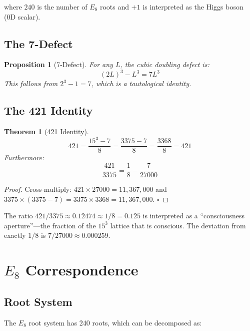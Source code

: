 \documentclass[11pt]{article}
\newtheorem{theorem}{Theorem}
\newtheorem{proposition}{Proposition}
\begin{document}
where $240$ is the number of $E_8$ roots and $+1$ is interpreted as the Higgs boson (0D scalar).

\subsection{The 7-Defect}

\begin{proposition}[7-Defect]
For any $L$, the cubic doubling defect is:
\begin{equation}
(2L)^3 - L^3 = 7L^3
\end{equation}
This follows from $2^3 - 1 = 7$, which is a tautological identity.
\end{proposition}

\subsection{The 421 Identity}

\begin{theorem}[421 Identity]
\begin{equation}
421 = \frac{15^3 - 7}{8} = \frac{3375 - 7}{8} = \frac{3368}{8} = 421
\end{equation}
Furthermore:
\begin{equation}
\frac{421}{3375} = \frac{1}{8} - \frac{7}{27000}
\end{equation}
\end{theorem}

\begin{proof}
Cross-multiply: $421 \times 27000 = 11{,}367{,}000$ and $3375 \times (3375 - 7) = 3375 \times 3368 = 11{,}367{,}000$. $\square$
\end{proof}

The ratio $421/3375 \approx 0.12474 \approx 1/8 = 0.125$ is interpreted as a ``consciousness aperture''---the fraction of the $15^3$ lattice that is conscious. The deviation from exactly $1/8$ is $7/27000 \approx 0.000259$.

\section{$E_8$ Correspondence}

\subsection{Root System}

The $E_8$ root system has 240 roots, which can be decomposed as:
\end{document}
